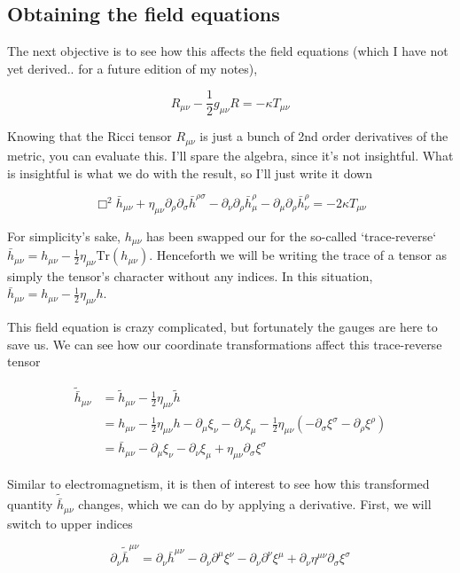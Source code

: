 \documentclass{article}
\newcommand{\mn}{_{\mu\nu}}
\newcommand{\umn}{^{\mu\nu}}
\newcommand{\p}{\partial}
\begin{document}
\subsection{Obtaining the field equations}
The next objective is to see how this affects the field equations (which I have not yet derived.. for a future edition of my notes),

\begin{equation}
    R\mn - \frac{1}{2}g\mn R = -\kappa T\mn
\end{equation}

Knowing that the Ricci tensor $R\mn$ is just a bunch of 2nd order derivatives of the metric, you can evaluate this. I'll spare the algebra, since it's not insightful. What is insightful is what we do with the result, so I'll just write it down

\begin{equation}
    \Box^2 \bar{h}\mn + \eta\mn\p_\rho\p_\sigma\bar{h}^{\rho\sigma} - \p_\nu\p_\rho\bar{h}^\rho_\mu - \p_\mu\p_\rho\bar{h}^\rho_\nu = -2\kappa T\mn
\end{equation}

For simplicity's sake, $h\mn$ has been swapped our for the so-called `trace-reverse` $\bar{h}\mn=h\mn-\frac{1}{2}\eta\mn\text{Tr}(h\mn)$. Henceforth we will be writing the trace of a tensor as simply the tensor's character without any indices. In this situation, $\bar{h}\mn=h\mn-\frac{1}{2}\eta\mn h$. 

This field equation is crazy complicated, but fortunately the gauges are here to save us. We can see how our coordinate transformations affect this trace-reverse tensor

\begin{align}
    \tilde{\bar{h}}\mn &= \tilde{h}\mn - \frac{1}{2}\eta\mn \tilde{h} \\
    &= h\mn - \frac{1}{2}\eta\mn h - \p_\mu\xi_\nu - \p_\nu\xi_\mu -\frac{1}{2}\eta\mn(-\p_\sigma\xi^\sigma - \p_\rho\xi^\rho) \\
    &= \bar{h}\mn - \p_\mu\xi_\nu - \p_\nu\xi_\mu + \eta\mn\p_\sigma\xi^\sigma
\end{align}

Similar to electromagnetism, it is then of interest to see how this transformed quantity $\tilde{\bar{h}}\mn$ changes, which we can do by applying a derivative. First, we will switch to upper indices

\begin{equation}
    \p_\nu \tilde{\bar{h}}\umn = \p_\nu\bar{h}\umn - \p_\nu\p^\mu\xi^\nu - \p_\nu\p^\nu\xi^\mu + \p_\nu\eta\umn\p_\sigma\xi^\sigma
\end{equation}
\end{document}
